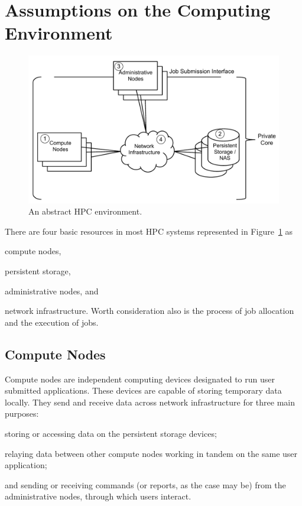 \documentclass[oneside,12pt]{memoir}
\begin{document}
\section{Assumptions on the Computing Environment}
\begin{figure}
\centering
\includegraphics[scale=0.7]{abstract_hpc_environment.pdf}
\caption{An abstract HPC environment.}
\label{fig:abstract_hpc_environment}
\end{figure}
There are four basic resources in most HPC systems represented in Figure~\ref{fig:abstract_hpc_environment} as \begin{inparaenum}
\item compute nodes, \item persistent storage, \item administrative nodes, and \item network infrastructure. Worth consideration also is the process of job allocation and the execution of jobs.\end{inparaenum}
\subsection{Compute Nodes}
Compute nodes are independent computing devices designated to run user submitted applications. These devices are capable of storing temporary data locally. They send and receive data across network infrastructure for three main purposes:\begin{inparaenum}
\item storing or accessing data on the persistent storage devices;
\item relaying data between other compute nodes working in tandem on the same user application;
\item and sending or receiving commands (or reports, as the case may be) from the administrative nodes, through which users interact.\end{inparaenum} 
\end{document}
